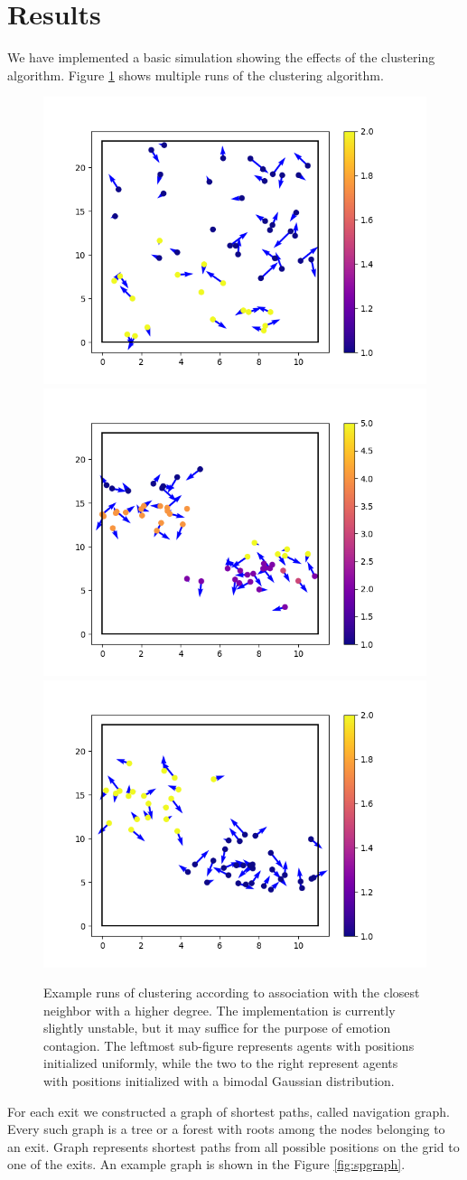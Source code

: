 \documentclass[9pt]{pnas-new}
\begin{document}
\section{Results}
We have implemented a basic simulation showing the effects of the clustering algorithm. Figure \ref{fig:enter-label} shows multiple runs of the clustering algorithm.

\begin{figure}[h!]
    \centering
    \includegraphics[width=0.3\linewidth]{fig/Figure_2.png}
    \hfill
    \includegraphics[width=0.3\linewidth]{fig/Figure_3.png}
    \hfill
    \includegraphics[width=0.3\linewidth]{fig/Figure_4.png}
    \caption{Example runs of clustering according to association with the closest neighbor with a higher degree. The implementation is currently slightly unstable, but it may suffice for the purpose of emotion contagion. The leftmost sub-figure represents agents with positions initialized uniformly, while the two to the right represent agents with positions initialized with a bimodal Gaussian distribution.}
    \label{fig:enter-label}
\end{figure}

For each exit we constructed a graph of shortest paths, called navigation graph. Every such graph is a tree or a forest with roots among the nodes belonging to an exit. Graph represents shortest paths from all possible positions on the grid to one of the exits. An example graph is shown in the Figure \ref{fig:spgraph}.
\end{document}
